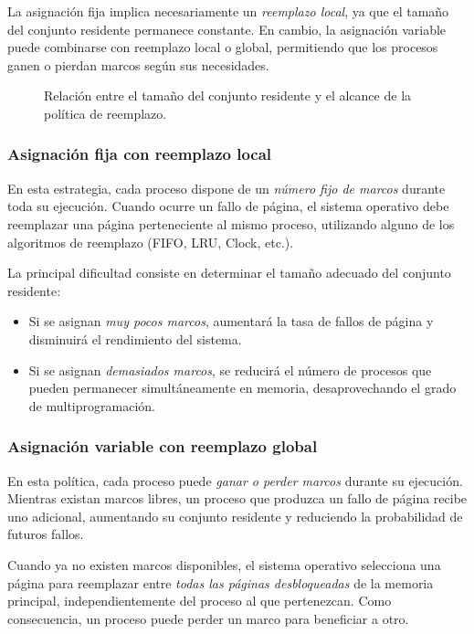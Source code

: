 La asignación fija implica necesariamente un \textit{reemplazo local}, ya que el tamaño del conjunto residente permanece constante. En cambio, la asignación variable puede combinarse con reemplazo local o global, permitiendo que los procesos ganen o pierdan marcos según sus necesidades.

\begin{figure}[!ht]
    \centering
    \caption{Relación entre el tamaño del conjunto residente y el alcance de la política de reemplazo.}
\end{figure}


\subsubsection{Asignación fija con reemplazo local}

En esta estrategia, cada proceso dispone de un \textit{número fijo de marcos} durante toda su ejecución. Cuando ocurre un fallo de página, el sistema operativo debe reemplazar una página perteneciente al mismo proceso, utilizando alguno de los algoritmos de reemplazo (FIFO, LRU, Clock, etc.).

La principal dificultad consiste en determinar el tamaño adecuado del conjunto residente:
\begin{itemize}
  \item Si se asignan \textit{muy pocos marcos}, aumentará la tasa de fallos de página y disminuirá el rendimiento del sistema.
  \item Si se asignan \textit{demasiados marcos}, se reducirá el número de procesos que pueden permanecer simultáneamente en memoria, desaprovechando el grado de multiprogramación.
\end{itemize}

\subsubsection{Asignación variable con reemplazo global}

En esta política, cada proceso puede \textit{ganar o perder marcos} durante su ejecución. Mientras existan marcos libres, un proceso que produzca un fallo de página recibe uno adicional, aumentando su conjunto residente y reduciendo la probabilidad de futuros fallos.

Cuando ya no existen marcos disponibles, el sistema operativo selecciona una página para reemplazar entre \textit{todas las páginas desbloqueadas} de la memoria principal, independientemente del proceso al que pertenezcan. Como consecuencia, un proceso puede perder un marco para beneficiar a otro.

